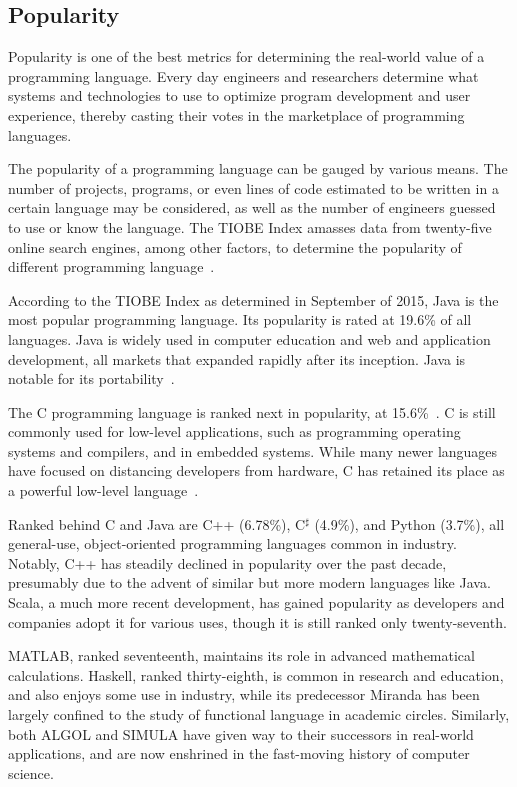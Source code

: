 \documentclass{article}
\begin{document}
\subsection{Popularity}

Popularity is one of the best metrics for determining the real-world value of a programming language. Every day engineers and researchers determine what systems and technologies to use to optimize program development and user experience, thereby casting their votes in the marketplace of programming languages.

The popularity of a programming language can be gauged by various means. The number of projects, programs, or even lines of code estimated to be written in a certain language may be considered, as well as the number of engineers guessed to use or know the language. The TIOBE Index amasses data from twenty-five online search engines, among other factors, to determine the popularity of different programming language~\cite{tiobe1}.

According to the TIOBE Index as determined in September of 2015, Java is the most popular programming language. Its popularity is rated at 19.6\% of all languages. Java is widely used in computer education and web and application development, all markets that expanded rapidly after its inception. Java is notable for its portability~\cite{popular1}.

The C programming language is ranked next in popularity, at 15.6\%~\cite{tiobe1}. C is still commonly used for low-level applications, such as programming operating systems and compilers, and in embedded systems. While many newer languages have focused on distancing developers from hardware, C has retained its place as a powerful low-level language~\cite{popular1}.

Ranked behind C and Java are C++ (6.78\%), C$^\sharp$ (4.9\%), and Python (3.7\%), all general-use, object-oriented programming languages common in industry. Notably, C++ has steadily declined in popularity over the past decade, presumably due to the advent of similar but more modern languages like Java. Scala, a much more recent development, has gained popularity as developers and companies adopt it for various uses, though it is still ranked only twenty-seventh.

MATLAB, ranked seventeenth, maintains its role in advanced mathematical calculations. Haskell, ranked thirty-eighth, is common in research and education, and also enjoys some use in industry, while its predecessor Miranda has been largely confined to the study of functional language in academic circles. Similarly, both ALGOL and SIMULA have given way to their successors in real-world applications, and are now enshrined in the fast-moving history of computer science.

\clearpage



\end{document}
